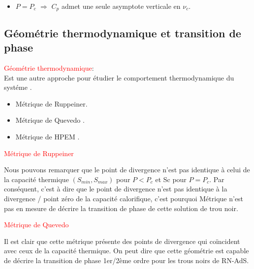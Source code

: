 \documentclass{beamer}
\begin{document}
\begin{frame}
\begin{itemize}
\item $P=P_{c} $ $\Rightarrow$ $C_{p}$  admet une seule asymptote verticale en $\nu_{c}$.
\end{itemize}
\end{frame}
\subsection{Géométrie thermodynamique et transition de phase}
\begin{frame}
\textcolor{red}{Géométrie thermodynamique}:\\
Est une autre approche pour étudier le comportement thermodynamique
du systéme .  
\begin{itemize}
\item Métrique de Ruppeiner.
\item Métrique de Quevedo .
\item Métrique de HPEM .
\end{itemize}

\end{frame}
\begin{frame}
\textcolor{red}{Métrique de Ruppeiner}

\begin{block}{}
Nous pouvons remarquer que le point de divergence n’est pas identique à celui de la
capacité thermique $(S_{min}, S_{max})$ pour $P < P_{c}$ et Sc pour $ P = P_{c}$. Par conséquent,
c'est à dire 
que le point de divergence n'est pas identique à la divergence / point zéro de la capacité calorifique, c'est pourquoi
Métrique n'est pas en mesure de décrire la transition de phase de cette solution de trou noir.
\end{block}
\end{frame}

\begin{frame}
\textcolor{red}{Métrique de Quevedo}

\begin{block}{}
	Il est clair que cette métrique présente des points de divergence qui coïncident avec
	ceux de la capacité thermique. On peut dire que cette géométrie est capable de décrire la
	transition de phase 1er/2ème ordre pour les trous noirs de RN-AdS.
\end{block}
\end{frame}
\end{document}
